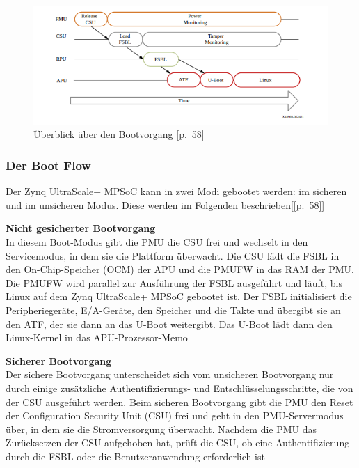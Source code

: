 \begin{figure}[h]
	\begin{center}
		\includegraphics[width=1.1\textwidth]{./images/boot-flow.jpg}
	\end{center}
	\vspace{-5pt}
	\caption[der Bootvorgang bei zynq+MPSoCs]{Überblick über den Bootvorgang \cite{XilinxInc.2019}[p.~58]} %
	\label{fig:boot:process}
	\vspace{-5pt}
\end{figure}


\subsubsection{Der Boot Flow}

Der Zynq UltraScale+ MPSoC kann in zwei Modi gebootet werden: im sicheren und im unsicheren Modus. Diese werden im Folgenden beschrieben[\cite{XilinxInc.2019}[p.~58]]

\textbf{\normalsize Nicht gesicherter Bootvorgang}\\
In diesem Boot-Modus gibt die PMU die CSU frei und wechselt in den Servicemodus, in dem sie die Plattform überwacht. Die CSU lädt die FSBL in den On-Chip-Speicher (OCM) der APU und die PMUFW in das RAM der PMU. Die PMUFW wird parallel zur Ausführung der FSBL ausgeführt und läuft, bis Linux auf dem Zynq UltraScale+ MPSoC gebootet ist. Der FSBL initialisiert die Peripheriegeräte, E/A-Geräte, den Speicher und die Takte und übergibt sie an den ATF, der sie dann an das U-Boot weitergibt. Das U-Boot lädt dann den Linux-Kernel in das APU-Prozessor-Memo

\textbf{Sicherer Bootvorgang}\\

Der sichere Bootvorgang unterscheidet sich vom unsicheren Bootvorgang nur durch einige zusätzliche Authentifizierungs- und Entschlüsselungsschritte, die von der CSU ausgeführt werden. Beim sicheren Bootvorgang gibt die PMU den Reset der Configuration Security Unit (CSU) frei und geht in den PMU-Servermodus über, in dem sie die Stromversorgung überwacht. Nachdem die PMU das Zurücksetzen der CSU aufgehoben hat, prüft die CSU, ob eine Authentifizierung durch die FSBL oder die Benutzeranwendung erforderlich ist 

